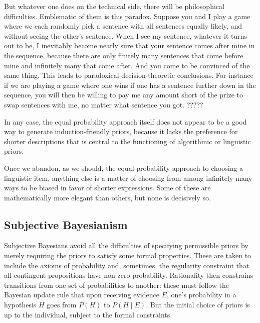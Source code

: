 But whatever one does on the technical side, there will be philosophical
difficulties. Emblematic of them is this paradox. Suppose you and I play a game where we each randomly pick a sentence with
all sentences equally likely, and without seeing the other's sentence. When I see my sentence, whatever it turns out to be, I inevitably become nearly sure that your 
sentence comes after mine in the sequence, because there are only finitely many sentences that come before mine and infinitely
many that come after. And you come to be convinced of the same thing. This leads to paradoxical decision-theoretic conclusions.
For instance if we are playing a game where one wins if one has a sentence further down in the sequence, you will then be willing to pay
me any amount short of the prize to swap sentences with me, no matter what sentence you got. ?????

In any case, the equal probability approach itself does not appear to be a good way to generate induction-friendly priors, 
because it lacks the preference for shorter descriptions that is central to the functioning of algorithmic or linguistic
priors. 

Once we abandon, as we should, the equal probability approach to choosing a linguistic item, anything else is a matter 
of choosing from among infinitely many ways to be biased in favor of shorter expressions. Some of these are mathematically
more elegant than others, but none is decisively so.

\subsection{Subjective Bayesianism}
Subjective Bayesians avoid all the difficulties of specifying permissible priors by merely
requiring the priors to satisfy some formal properties. These are taken to include the
axioms of probability and, sometimes, the regularity constraint that all contingent 
propositions have non-zero probability. Rationality then constrains transitions from one
set of probabilities to another: these must follow the Bayesian update rule that upon
receiving evidence $E$, one's probability in a hypothesis $H$ goes from $P(H)$ to 
$P(H\mid E)$. But the initial choice of priors is up to the individual, subject to the
formal constraints.

